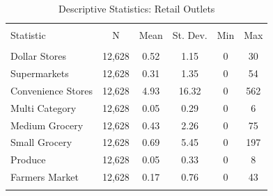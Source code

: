 
\begin{table}[!htbp] \centering 
  \caption{Descriptive Statistics: Retail Outlets} 
  \label{tab:desc_stats} 
\begin{tabular}{@{\extracolsep{5pt}}lccccc} 
\\[-1.8ex]\hline 
\hline \\[-1.8ex] 
Statistic & \multicolumn{1}{c}{N} & \multicolumn{1}{c}{Mean} & \multicolumn{1}{c}{St. Dev.} & \multicolumn{1}{c}{Min} & \multicolumn{1}{c}{Max} \\ 
\hline \\[-1.8ex] 
Dollar Stores & 12,628 & 0.52 & 1.15 & 0 & 30 \\ 
Supermarkets & 12,628 & 0.31 & 1.35 & 0 & 54 \\ 
Convenience Stores & 12,628 & 4.93 & 16.32 & 0 & 562 \\ 
Multi Category & 12,628 & 0.05 & 0.29 & 0 & 6 \\ 
Medium Grocery & 12,628 & 0.43 & 2.26 & 0 & 75 \\ 
Small Grocery & 12,628 & 0.69 & 5.45 & 0 & 197 \\ 
Produce & 12,628 & 0.05 & 0.33 & 0 & 8 \\ 
Farmers Market & 12,628 & 0.17 & 0.76 & 0 & 43 \\ 
\hline \\[-1.8ex] 
\end{tabular} 
\end{table} 
